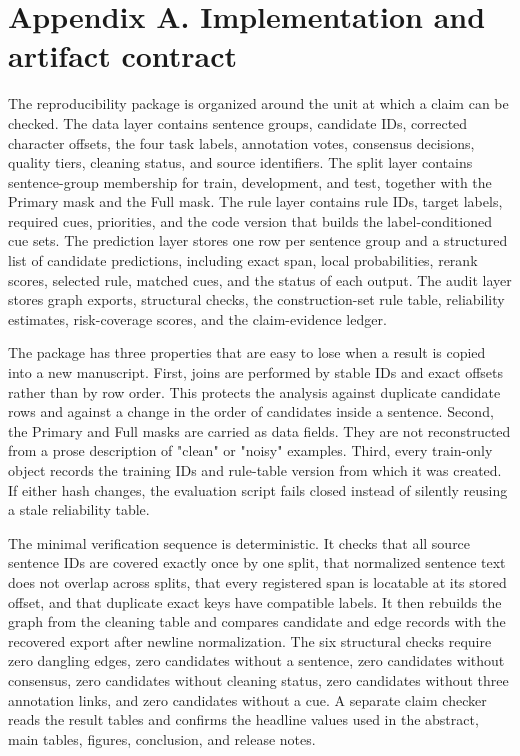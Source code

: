 \documentclass{CUP-JNL-NLP}
\begin{document}
\section{Appendix A. Implementation and artifact contract}
The reproducibility package is organized around the unit at which a claim can be checked. The data layer contains sentence groups, candidate IDs, corrected character offsets, the four task labels, annotation votes, consensus decisions, quality tiers, cleaning status, and source identifiers. The split layer contains sentence-group membership for train, development, and test, together with the Primary mask and the Full mask. The rule layer contains rule IDs, target labels, required cues, priorities, and the code version that builds the label-conditioned cue sets. The prediction layer stores one row per sentence group and a structured list of candidate predictions, including exact span, local probabilities, rerank scores, selected rule, matched cues, and the status of each output. The audit layer stores graph exports, structural checks, the construction-set rule table, reliability estimates, risk-coverage scores, and the claim-evidence ledger.

The package has three properties that are easy to lose when a result is copied into a new manuscript. First, joins are performed by stable IDs and exact offsets rather than by row order. This protects the analysis against duplicate candidate rows and against a change in the order of candidates inside a sentence. Second, the Primary and Full masks are carried as data fields. They are not reconstructed from a prose description of "clean" or "noisy" examples. Third, every train-only object records the training IDs and rule-table version from which it was created. If either hash changes, the evaluation script fails closed instead of silently reusing a stale reliability table.

The minimal verification sequence is deterministic. It checks that all source sentence IDs are covered exactly once by one split, that normalized sentence text does not overlap across splits, that every registered span is locatable at its stored offset, and that duplicate exact keys have compatible labels. It then rebuilds the graph from the cleaning table and compares candidate and edge records with the recovered export after newline normalization. The six structural checks require zero dangling edges, zero candidates without a sentence, zero candidates without consensus, zero candidates without cleaning status, zero candidates without three annotation links, and zero candidates without a cue. A separate claim checker reads the result tables and confirms the headline values used in the abstract, main tables, figures, conclusion, and release notes.
\end{document}

